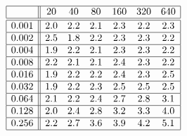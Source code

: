 \[
\begin{array}{|c||cccccc|}
\hline 
& 20 & 40 & 80 & 160 & 320 & 640\\
\hline \hline 
0.001 & 2.0 & 2.2 & 2.1 & 2.3 & 2.2 & 2.3 \\ \hline 
0.002 & 2.5 & 1.8 & 2.2 & 2.3 & 2.3 & 2.2 \\ \hline 
0.004 & 1.9 & 2.2 & 2.1 & 2.3 & 2.3 & 2.2 \\ \hline 
0.008 & 2.2 & 2.1 & 2.1 & 2.4 & 2.3 & 2.2 \\ \hline 
0.016 & 1.9 & 2.2 & 2.2 & 2.4 & 2.3 & 2.5 \\ \hline 
0.032 & 1.9 & 2.2 & 2.3 & 2.5 & 2.5 & 2.5 \\ \hline 
0.064 & 2.1 & 2.2 & 2.4 & 2.7 & 2.8 & 3.1 \\ \hline 
0.128 & 2.0 & 2.4 & 2.8 & 3.2 & 3.3 & 4.0 \\ \hline 
0.256 & 2.2 & 2.7 & 3.6 & 3.9 & 4.2 & 5.1 \\ \hline 
\end{array}
\]

